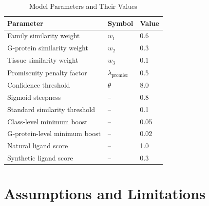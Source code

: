 \documentclass[12pt,oneside]{article}
\theoremstyle{definition}
\begin{document}
\begin{table}[h]
\centering
\caption{Model Parameters and Their Values}
\label{tab:parameters}
\begin{tabular}{lll}
\toprule
\textbf{Parameter} & \textbf{Symbol} & \textbf{Value} \\
\midrule
Family similarity weight & $w_1$ & 0.6 \\
G-protein similarity weight & $w_2$ & 0.3 \\
Tissue similarity weight & $w_3$ & 0.1 \\
Promiscuity penalty factor & $\lambda_{\text{promisc}}$ & 0.5 \\
Confidence threshold & $\theta$ & 8.0 \\
Sigmoid steepness & -- & 0.8 \\
Standard similarity threshold & -- & 0.1 \\
Class-level minimum boost & -- & 0.05 \\
G-protein-level minimum boost & -- & 0.02 \\
Natural ligand score & -- & 1.0 \\
Synthetic ligand score & -- & 0.3 \\
\bottomrule
\end{tabular}
\end{table}

\section{Assumptions and Limitations}
\end{document}
